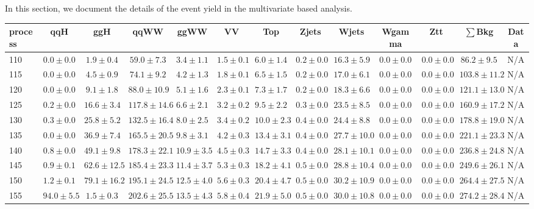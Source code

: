 In this section, we document the details of the event yield in 
the multivariate based analysis.

\begin{table}
{%
 \tiny
 \begin{center}
 \begin{tabular}{l | c c | c c c c c c c c  | c c}
 \hline
 process & qqH & ggH & qqWW & ggWW & VV & Top & Zjets & Wjets & Wgamma & Ztt & $\sum$Bkg & Data \\
 \hline
110 & $0.0\pm0.0$ & $1.9\pm0.4$ & $59.0\pm7.3$ & $3.4\pm1.1$ & $1.5\pm0.1$ & $6.0\pm1.4$ & $0.2\pm0.0$ & $16.3\pm5.9$ & $0.0\pm0.0$ & $0.0\pm0.0$ & $86.2\pm9.5$ & N/A \\
115 & $0.0\pm0.0$ & $4.5\pm0.9$ & $74.1\pm9.2$ & $4.2\pm1.3$ & $1.8\pm0.1$ & $6.5\pm1.5$ & $0.2\pm0.0$ & $17.0\pm6.1$ & $0.0\pm0.0$ & $0.0\pm0.0$ & $103.8\pm11.2$ & N/A \\
120 & $0.0\pm0.0$ & $9.1\pm1.8$ & $88.0\pm10.9$ & $5.1\pm1.6$ & $2.3\pm0.1$ & $7.3\pm1.7$ & $0.2\pm0.0$ & $18.3\pm6.6$ & $0.0\pm0.0$ & $0.0\pm0.0$ & $121.1\pm13.0$ & N/A \\
125 & $0.2\pm0.0$ & $16.6\pm3.4$ & $117.8\pm14.6$ & $6.6\pm2.1$ & $3.2\pm0.2$ & $9.5\pm2.2$ & $0.3\pm0.0$ & $23.5\pm8.5$ & $0.0\pm0.0$ & $0.0\pm0.0$ & $160.9\pm17.2$ & N/A \\
130 & $0.3\pm0.0$ & $25.8\pm5.2$ & $132.5\pm16.4$ & $8.0\pm2.5$ & $3.4\pm0.2$ & $10.0\pm2.3$ & $0.4\pm0.0$ & $24.4\pm8.8$ & $0.0\pm0.0$ & $0.0\pm0.0$ & $178.8\pm19.0$ & N/A \\
135 & $0.0\pm0.0$ & $36.9\pm7.4$ & $165.5\pm20.5$ & $9.8\pm3.1$ & $4.2\pm0.3$ & $13.4\pm3.1$ & $0.4\pm0.0$ & $27.7\pm10.0$ & $0.0\pm0.0$ & $0.0\pm0.0$ & $221.1\pm23.3$ & N/A \\
140 & $0.8\pm0.0$ & $49.1\pm9.8$ & $178.3\pm22.1$ & $10.9\pm3.5$ & $4.5\pm0.3$ & $14.7\pm3.3$ & $0.4\pm0.0$ & $28.1\pm10.1$ & $0.0\pm0.0$ & $0.0\pm0.0$ & $236.8\pm24.8$ & N/A \\
145 & $0.9\pm0.1$ & $62.6\pm12.5$ & $185.4\pm23.3$ & $11.4\pm3.7$ & $5.3\pm0.3$ & $18.2\pm4.1$ & $0.5\pm0.0$ & $28.8\pm10.4$ & $0.0\pm0.0$ & $0.0\pm0.0$ & $249.6\pm26.1$ & N/A \\
150 & $1.2\pm0.1$ & $79.1\pm16.2$ & $195.1\pm24.5$ & $12.5\pm4.0$ & $5.6\pm0.3$ & $20.4\pm4.7$ & $0.5\pm0.0$ & $30.2\pm10.9$ & $0.0\pm0.0$ & $0.0\pm0.0$ & $264.4\pm27.5$ & N/A \\
155 & $94.0\pm5.5$ & $1.5\pm0.3$ & $202.6\pm25.5$ & $13.5\pm4.3$ & $5.8\pm0.4$ & $21.9\pm5.0$ & $0.5\pm0.0$ & $30.0\pm10.8$ & $0.0\pm0.0$ & $0.0\pm0.0$ & $274.2\pm28.4$ & N/A \\

\end{tabular}
\end{center}}
\end{table}
